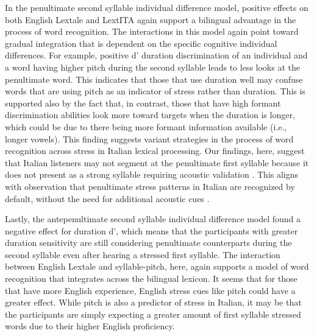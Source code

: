 In the penultimate second syllable individual difference model, positive effects on both English Lextale and LextITA again support a bilingual advantage in the process of word recognition. The interactions in this model again point toward gradual integration that is dependent on the specific cognitive individual differences. For example, positive d' duration discrimination of an individual and a word having higher pitch during the second syllable leads to less looks at the penultimate word. This indicates that those that use duration well may confuse words that are using pitch as an indicator of stress rather than duration. This is supported also by the fact that, in contrast, those that have high formant discrimination abilities look more toward targets when the duration is longer, which could be due to there being more formant information available (i.e., longer vowels). This finding suggests variant strategies in the process of word recognition across stress in Italian lexical processing. Our findings, here, suggest that Italian listeners may not segment at the penultimate first syllable because it does not present as a strong syllable requiring acoustic validation \cite{CutlerNorris1988}. This aligns with observation that penultimate stress patterns in Italian are recognized by default, without the need for additional acoustic cues \cite{Sulpizio_McQueen_2012}.

Lastly, the antepenultimate second syllable individual difference model found a negative effect for duration d', which means that the participants with greater duration sensitivity are still considering penultimate counterparts during the second syllable even after hearing a stressed first syllable. The interaction between English Lextale and syllable-pitch, here, again supports a model of word recognition that integrates across the bilingual lexicon. It seems that for those that have more English experience, English stress cues like pitch could have a greater effect. While pitch is also a predictor of stress in Italian, it may be that the participants are simply expecting a greater amount of first syllable stressed words due to their higher English proficiency.


